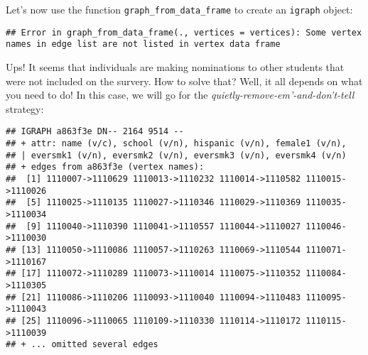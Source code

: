 \documentclass[]{book}
\newenvironment{Shaded}{\begin{snugshade}}{\end{snugshade}}
\newcommand{\KeywordTok}[1]{\textcolor[rgb]{0.13,0.29,0.53}{\textbf{#1}}}
\newcommand{\DataTypeTok}[1]{\textcolor[rgb]{0.13,0.29,0.53}{#1}}
\newcommand{\StringTok}[1]{\textcolor[rgb]{0.31,0.60,0.02}{#1}}
\newcommand{\CommentTok}[1]{\textcolor[rgb]{0.56,0.35,0.01}{\textit{#1}}}
\newcommand{\OperatorTok}[1]{\textcolor[rgb]{0.81,0.36,0.00}{\textbf{#1}}}
\newcommand{\NormalTok}[1]{#1}
\theoremstyle{definition}
\theoremstyle{definition}
\theoremstyle{definition}
\theoremstyle{remark}
\begin{document}
Let's now use the function \texttt{graph\_from\_data\_frame} to create
an \texttt{igraph} object:

\begin{Shaded}
\end{Shaded}

\begin{verbatim}
## Error in graph_from_data_frame(., vertices = vertices): Some vertex names in edge list are not listed in vertex data frame
\end{verbatim}

Ups! It seems that individuals are making nominations to other students
that were not included on the survery. How to solve that? Well, it all
depends on what you need to do! In this case, we will go for the
\emph{quietly-remove-em'-and-don't-tell} strategy:

\begin{Shaded}
\end{Shaded}

\begin{verbatim}
## IGRAPH a863f3e DN-- 2164 9514 -- 
## + attr: name (v/c), school (v/n), hispanic (v/n), female1 (v/n),
## | eversmk1 (v/n), eversmk2 (v/n), eversmk3 (v/n), eversmk4 (v/n)
## + edges from a863f3e (vertex names):
##  [1] 1110007->1110629 1110013->1110232 1110014->1110582 1110015->1110026
##  [5] 1110025->1110135 1110027->1110346 1110029->1110369 1110035->1110034
##  [9] 1110040->1110390 1110041->1110557 1110044->1110027 1110046->1110030
## [13] 1110050->1110086 1110057->1110263 1110069->1110544 1110071->1110167
## [17] 1110072->1110289 1110073->1110014 1110075->1110352 1110084->1110305
## [21] 1110086->1110206 1110093->1110040 1110094->1110483 1110095->1110043
## [25] 1110096->1110065 1110109->1110330 1110114->1110172 1110115->1110039
## + ... omitted several edges
\end{verbatim}
\end{document}
